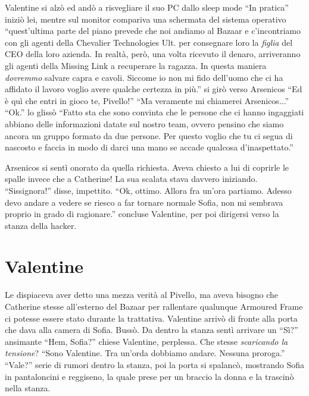     Valentine si alzò ed andò a risvegliare il suo PC dallo sleep mode ``In pratica'' iniziò lei, mentre sul monitor
    compariva una schermata del sistema operativo ``quest'ultima parte del piano prevede che noi andiamo al Bazaar e
    c'incontriamo con gli agenti della Chevalier Technologies Ult. per consegnare loro la \emph{figlia} del CEO della
    loro azienda. In realtà, però, una volta ricevuto il denaro, arriveranno gli agenti della Missing Link a recuperare
    la ragazza. In questa maniera \emph{dovremmo} salvare capra e cavoli. Siccome io non mi fido dell'uomo che ci ha
    affidato il lavoro voglio avere qualche certezza in più.'' si girò verso Arsenicos ``Ed è quì che entri in gioco te,
    Pivello!'' ``Ma veramente mi chiamerei Arsenicos...'' ``Ok.'' lo glissò ``Fatto sta che sono convinta che le persone
    che ci hanno ingaggiati abbiano delle informazioni datate sul nostro team, ovvero pensino che siamo ancora un gruppo
    formato da due persone. Per questo voglio che tu ci segua di nascosto e faccia in modo di darci una mano se accade
    qualcosa d'inaspettato.''

    Arsenicos si sentì onorato da quella richiesta. Aveva chiesto a lui di coprirle le spalle invece che a Catherine! La
    sua scalata stava davvero iniziando. ``Sissignora!'' disse, impettito. ``Ok, ottimo. Allora fra un'ora partiamo.
    Adesso devo andare a vedere se riesco a far tornare normale Sofia, non mi sembrava proprio in grado di ragionare.''
    concluse Valentine, per poi dirigersi verso la stanza della hacker.

  \section*{Valentine}

    Le dispiaceva aver detto una mezza verità al Pivello, ma aveva bisogno che Catherine stesse all'esterno del Bazaar
    per rallentare qualunque Armoured Frame ci potesse essere stato durante la trattativa. Valentine arrivò di fronte
    alla porta che dava alla camera di Sofia. Bussò. Da dentro la stanza sentì arrivare un ``Sì?'' ansimante ``Hem,
    Sofia?'' chiese Valentine, perplessa. Che stesse \emph{scaricando la tensione}? ``Sono Valentine. Tra un'orda
    dobbiamo andare. Nessuna proroga.'' ``Vale?'' serie di rumori dentro la stanza, poi la porta si spalancò, mostrando
    Sofia in pantaloncini e reggiseno, la quale prese per un braccio la donna e la trascinò nella stanza.

